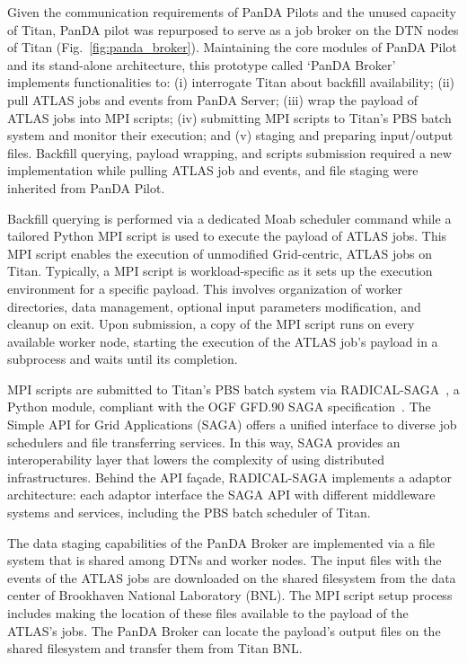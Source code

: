 Given the communication requirements of PanDA Pilots and the unused capacity
of Titan, PanDA pilot was repurposed to serve as a job broker on the DTN
nodes of Titan (Fig.~\ref{fig:panda_broker}). Maintaining the core modules of
PanDA Pilot and its stand-alone architecture, this prototype called `PanDA
Broker' implements functionalities to: (i) interrogate Titan about backfill
availability; (ii) pull ATLAS jobs and events from PanDA Server; (iii) wrap
the payload of ATLAS jobs into MPI scripts; (iv) submitting MPI scripts to
Titan's PBS batch system and monitor their execution; and (v) staging and
preparing input/output files. Backfill querying, payload wrapping, and
scripts submission required a new implementation while pulling ATLAS job and
events, and file staging were inherited from PanDA Pilot.

Backfill querying is performed via a dedicated Moab scheduler command while a
tailored Python MPI script is used to execute the payload of ATLAS jobs. This
MPI script enables the execution of unmodified Grid-centric, ATLAS jobs on
Titan. Typically, a MPI script is workload-specific as it sets up the
execution environment for a specific payload. This involves organization of
worker directories, data management, optional input parameters modification,
and cleanup on exit. Upon submission, a copy of the MPI script runs on every
available worker node, starting the execution of the ATLAS job's payload in a
subprocess and waits until its completion.

MPI scripts are submitted to Titan's PBS batch system via
RADICAL-SAGA~\cite{radical-saga_url}, a Python module, compliant with the OGF
GFD.90 SAGA specification~\cite{goodale2008simple}. The Simple API for Grid
Applications (SAGA) offers a unified interface to diverse job schedulers and
file transferring services. In this way, SAGA provides an interoperability
layer that lowers the complexity of using distributed infrastructures. Behind
the API façade, RADICAL-SAGA implements a adaptor architecture: each adaptor
interface the SAGA API with different middleware systems and services,
including the PBS batch scheduler of Titan.

The data staging capabilities of the PanDA Broker are implemented via a file
system that is shared among DTNs and worker nodes. The input files with the
events of the ATLAS jobs are downloaded on the shared filesystem from the
data center of Brookhaven National Laboratory (BNL). The MPI script setup
process includes making the location of these files available to the payload
of the ATLAS's jobs. The PanDA Broker can locate the payload's output files
on the shared filesystem and transfer them from Titan BNL.

